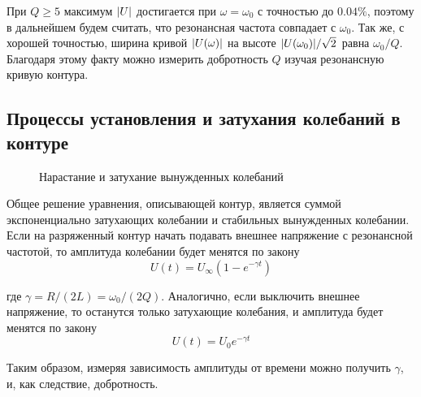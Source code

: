 \documentclass{article}
\begin{document}
При $Q \ge 5$ максимум $\abs{U}$ достигается при $\omega = \omega_0$ с точностью до 
$0.04\%$, поэтому в дальнейшем будем считать, что резонансная частота совпадает с
$\omega_0$. Так же, с хорошей точностью, ширина кривой $\abs{U(\omega)}$ на высоте
$\abs{U(\omega_0)} / \sqrt{2}$ равна $\omega_0/Q$. Благодаря этому факту можно измерить
добротность $Q$ изучая резонансную кривую контура.

\newpage
\subsection{Процессы установления и затухания колебаний в контуре}\label{theory_perexod}
\begin{figure}[h]
    \caption{Нарастание и затухание вынужденных колебаний}\label{fig:ustanovlenie_zatuxanie}
    \newpage
\end{figure}

Общее решение уравнения, описывающей контур, является суммой экспоненциально затухающих
колебании и стабильных вынужденных колебании. Если на разряженный контур начать подавать
внешнее напряжение с резонансной частотой, то амплитуда колебании будет менятся по закону
\begin{equation}
    U(t) = U_{\infty}(1 - e^{-\gamma t})
\end{equation}\label{eq:narastanie}

где $\gamma = R/(2L) = \omega_0 / (2Q)$. Аналогично, если выключить внешнее напряжение,
то останутся только затухающие колебания, и амплитуда будет менятся по закону
\begin{equation}
    U(t) = U_{0}e^{-\gamma t}
\end{equation}\label{eq:zatuxanie}

Таким образом, измеряя зависимость амплитуды от времени можно получить $\gamma$, и, как
следствие, добротность.

\newpage
\end{document}
